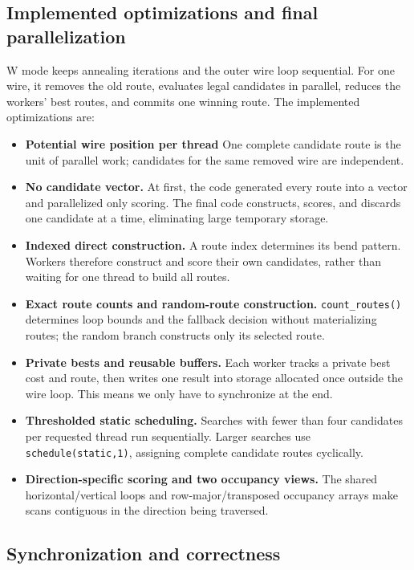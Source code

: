 \documentclass[11pt]{article}
\begin{document}
\subsection{Implemented optimizations and final parallelization}

W mode keeps annealing iterations and the outer wire loop sequential. For one
wire, it removes the old route, evaluates legal candidates in parallel, reduces
the workers' best routes, and commits one winning route. The implemented
optimizations are:

\begin{itemize}
\item \textbf{Potential wire position per thread} One complete candidate route is the
unit of parallel work; candidates for the same removed wire are independent.
\item \textbf{No candidate vector.} At first, the code generated every route into a vector
and parallelized only scoring. The final code constructs, scores, and discards
one candidate at a time, eliminating large temporary storage.
\item \textbf{Indexed direct construction.} A route index determines its bend
pattern. Workers therefore construct and score their own candidates, rather
than waiting for one thread to build all routes.
\item \textbf{Exact route counts and random-route construction.}
\texttt{count\_routes()} determines loop bounds and the fallback decision
without materializing routes; the random branch constructs only its selected
route.
\item \textbf{Private bests and reusable buffers.} Each worker tracks a private
best cost and route, then writes one result into storage allocated once outside
the wire loop. This means we only have to synchronize at the end.
\item \textbf{Thresholded static scheduling.} Searches with fewer than four
candidates per requested thread run sequentially. Larger searches use
\texttt{schedule(static,1)}, assigning complete candidate routes cyclically.
\item \textbf{Direction-specific scoring and two occupancy views.} The shared
horizontal/vertical loops and row-major/transposed occupancy arrays make scans
contiguous in the direction being traversed.
\end{itemize}

\subsection{Synchronization and correctness}
\end{document}
